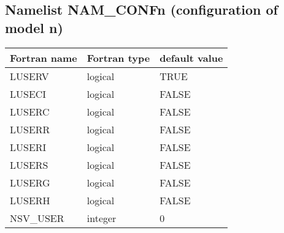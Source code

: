 \subsection{Namelist NAM\_CONFn (configuration of model n)}

\begin{center}
\begin{tabular} {|l|l|l|}
\hline
Fortran name & Fortran type & default value \\
\hline
LUSERV   & logical & TRUE  \\
LUSECI   & logical  & FALSE  \\
LUSERC   & logical  & FALSE  \\
LUSERR   & logical  & FALSE  \\
LUSERI   & logical  & FALSE  \\
LUSERS   & logical  & FALSE  \\
LUSERG   & logical  & FALSE  \\
LUSERH   & logical  & FALSE  \\
NSV\_USER & integer  & 0\\
\hline
\end{tabular}
\end{center}


